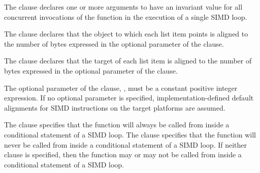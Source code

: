 The  clause declares one or more arguments to have an invariant value for all 
concurrent invocations of the function in the execution of a single SIMD loop.

\begin{samepage}
\ccppspecificstart
The  clause declares that the object to which each list item points is aligned to 
the number of bytes expressed in the optional parameter of the  clause.
\ccppspecificend
\end{samepage}

\begin{samepage}
\fortranspecificstart
The  clause declares that the target of each list item is aligned to the number 
of bytes expressed in the optional parameter of the  clause.
\fortranspecificend
\end{samepage}

The optional parameter of the  clause, , must be a constant positive 
integer expression. If no optional parameter is specified, implementation-defined default 
alignments for SIMD instructions on the target platforms are assumed.

The  clause specifies that the function will always be called from inside a 
conditional statement of a SIMD loop. The  clause specifies that the 
function will never be called from inside a conditional statement of a SIMD loop. If 
neither clause is specified, then the function may or may not be called from inside a 
conditional statement of a SIMD loop.

